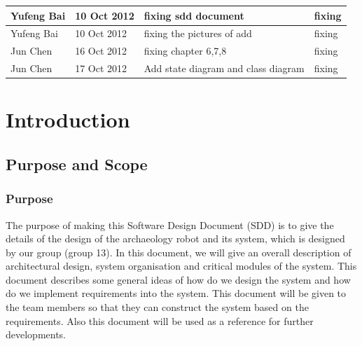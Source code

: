 \documentclass[11pt, a4paper]{report}
\begin{document}
\begin{tabular}{| l | l | l | l | }
Yufeng Bai	&	10 Oct 2012	&	fixing sdd document				&	fixing	\\ \hline
Yufeng Bai	&	10 Oct 2012	& fixing the pictures of add	&	fixing \\ \hline
Jun Chen     		&16 Oct 2012        	&	fixing chapter 6,7,8                  	  	&	fixing   	\\ \hline
Jun Chen    		&	17 Oct 2012     	&	Add state diagram and class diagram                  	  	&	fixing     	\\ \hline
%





\end{tabular}
\clearpage


\chapter{Introduction}%
\label{cha:I}


\section{Purpose and Scope}
\subsection{Purpose}
The purpose of making this Software Design Document (SDD) is to give the details of the design of the archaeology robot and its system, which is designed by our group (group 13). In this document, we will give an overall description of architectural design, system organisation and critical modules of the system. This document describes some general ideas of how do we design the system and how do we implement requirements into the system. This document will be given to the team members so that they can construct the system based on the requirements. Also this document will be used as a reference for further developments.
\end{document}
